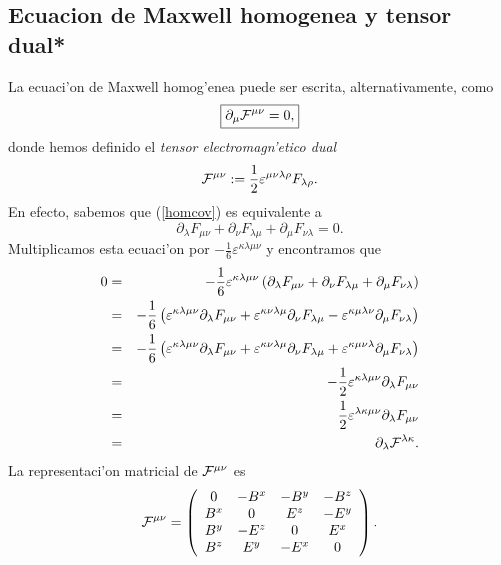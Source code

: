 \subsection{Ecuacion de Maxwell homogenea y tensor dual*}
La ecuaci'on de Maxwell homog'enea puede ser escrita, alternativamente, como
\begin{equation}
\boxed{\partial_\mu {\cal F}^{\mu\nu}=0,}
\end{equation}
donde hemos definido el \textit{tensor electromagn'etico dual}
\begin{equation}
{\cal F}^{\mu\nu}:=\frac{1}{2}\varepsilon^{\mu\nu\lambda\rho}F_{\lambda\rho} .
\end{equation}
En efecto, sabemos que (\ref{homcov}) es equivalente a
\begin{equation}
\partial_{\lambda}F_{\mu\nu}+\partial_{\nu}F_{\lambda\mu}+\partial_\mu %
F_{\nu\lambda}  =0.
\end{equation}
Multiplicamos esta ecuaci'on por $-\frac{1}{6}\varepsilon^{\kappa\lambda\mu\nu}$
y encontramos que
\begin{eqnarray}
0&=&-\frac{1}{6}\varepsilon^{\kappa\lambda\mu\nu}\left(  \partial_{\lambda}%
F_{\mu\nu}+\partial_{\nu}F_{\lambda\mu}+\partial_\mu F_{\nu\lambda}\right)\\
&=&-\frac{1}{6}\left(  \varepsilon^{\kappa\lambda\mu\nu}\partial_{\lambda}%
F_{\mu\nu}+\varepsilon^{\kappa\nu\lambda\mu}\partial_{\nu}F_{\lambda\mu
}-\varepsilon^{\kappa\mu\lambda\nu}\partial_\mu F_{\nu\lambda}\right) \\
&=&-\frac{1}{6}\left(  \varepsilon^{\kappa\lambda\mu\nu}\partial_{\lambda}%
F_{\mu\nu}+\varepsilon^{\kappa\nu\lambda\mu}\partial_{\nu}F_{\lambda\mu
}+\varepsilon^{\kappa\mu\nu\lambda}\partial_\mu F_{\nu\lambda}\right) \\
&=&-\frac{1}{2}\varepsilon^{\kappa\lambda\mu\nu}\partial_{\lambda}F_{\mu\nu} \\
&=&\frac{1}{2}\varepsilon^{\lambda\kappa\mu\nu}\partial_{\lambda}F_{\mu\nu} \\
&=&\partial_{\lambda}{\cal F}^{\lambda\kappa}  .
\end{eqnarray}
La representaci'on matricial de ${\cal F}^{\mu\nu}$ es
\begin{equation}
{\cal F}^{\mu\nu}=\left(
\begin{array}
[c]{cccc}%
0 & -B^x & -B^y & -B^z\\
B^x & 0 & E^z & -E^y\\
B^y & -E^z & 0 & E^x\\
B^z & E^y & -E^x & 0
\end{array}
\right). \label{Fdualupup}
\end{equation}


